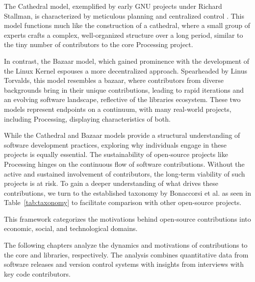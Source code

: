 The Cathedral model, exemplified by early GNU projects under Richard Stallman, is characterized by meticulous planning and centralized control \parencite{stallmanFreeSoftwareFree2002}. This model functions much like the construction of a cathedral, where a small group of experts crafts a complex, well‐organized structure over a long period, similar to the tiny number of contributors to the core Processing project. 

In contrast, the Bazaar model, which gained prominence with the 
development of the Linux Kernel espouses a more decentralized approach. Spearheaded by Linus Torvalds, this model resembles a bazaar, where contributors from diverse backgrounds bring in their unique contributions, leading to rapid iterations and an evolving software landscape, reflective of the libraries ecosystem. 
These two models represent endpoints on a continuum, with many real-world projects, including Processing, displaying characteristics of both. 

While the Cathedral and Bazaar models provide a structural understanding of software development practices, exploring why individuals engage in these projects is equally essential. The sustainability of open‐source projects like Processing hinges on the continuous flow of software contributions. Without the active and sustained involvement of contributors, the long‐term viability of such projects is at risk. To gain a deeper understanding of what drives these contributions, we turn to the established taxonomy by Bonaccorsi et al. as seen in Table~\ref{tab:taxonomy} \parencite{bonaccorsiComparingMotivationsIndividual2006} to facilitate comparison with other open-source projects.

This framework categorizes the motivations behind open‐source
contributions into economic, social, and technological domains.

The following chapters analyze the dynamics and motivations of contributions to the core and libraries, respectively. The analysis combines quantitative data from software releases and version control systems with insights from interviews with key code contributors.

